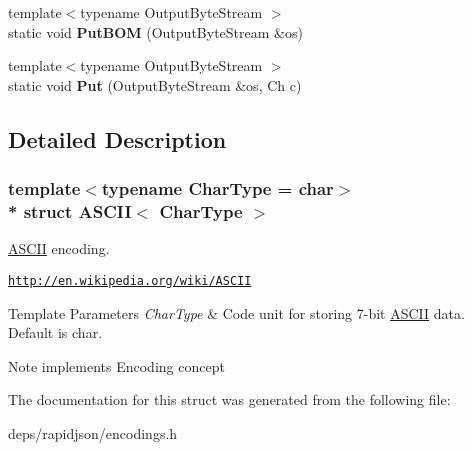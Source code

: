 \begin{DoxyCompactItemize}
\item 
{\footnotesize template$<$typename Output\+Byte\+Stream $>$ }\\static void {\bfseries Put\+B\+OM} (Output\+Byte\+Stream \&os)\hypertarget{struct_a_s_c_i_i_a3036dc1d604039c3224ca0a890ee0134}{}\label{struct_a_s_c_i_i_a3036dc1d604039c3224ca0a890ee0134}

\item 
{\footnotesize template$<$typename Output\+Byte\+Stream $>$ }\\static void {\bfseries Put} (Output\+Byte\+Stream \&os, Ch c)\hypertarget{struct_a_s_c_i_i_a218b244b9cd961ea6c5775a734cec20e}{}\label{struct_a_s_c_i_i_a218b244b9cd961ea6c5775a734cec20e}

\end{DoxyCompactItemize}


\subsection{Detailed Description}
\subsubsection*{template$<$typename Char\+Type = char$>$\\*
struct A\+S\+C\+I\+I$<$ Char\+Type $>$}

\hyperlink{struct_a_s_c_i_i}{A\+S\+C\+II} encoding. 

\href{http://en.wikipedia.org/wiki/ASCII}{\tt http\+://en.\+wikipedia.\+org/wiki/\+A\+S\+C\+II} 
\begin{DoxyTemplParams}{Template Parameters}
{\em Char\+Type} & Code unit for storing 7-\/bit \hyperlink{struct_a_s_c_i_i}{A\+S\+C\+II} data. Default is char. \\
\hline
\end{DoxyTemplParams}
\begin{DoxyNote}{Note}
implements Encoding concept 
\end{DoxyNote}


The documentation for this struct was generated from the following file\+:\begin{DoxyCompactItemize}
\item 
deps/rapidjson/encodings.\+h\end{DoxyCompactItemize}
